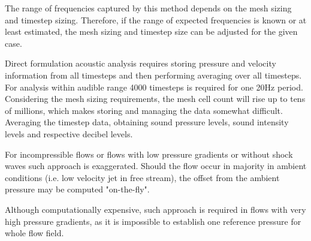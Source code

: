 The range of frequencies captured by this method depends on the mesh sizing and timestep sizing. Therefore, if the range of expected frequencies is known or at least estimated, the mesh sizing and timestep size can be adjusted for the given case.
 
Direct formulation acoustic analysis requires storing pressure and velocity information from all timesteps and then performing averaging over all timesteps. For analysis within audible range 4000 timesteps is required for one 20Hz period. Considering the mesh sizing requirements, the mesh cell count will rise up to tens of millions, which makes storing and managing the data somewhat difficult. Averaging the timestep data, obtaining sound pressure levels, sound intensity levels and respective decibel levels. 

For incompressible flows or flows with low pressure gradients or without shock waves such approach is exaggerated. Should the flow occur in majority in ambient conditions (i.e. low velocity jet in free stream), the offset from the ambient pressure may be computed "on-the-fly".

Although computationally expensive, such approach is required in flows with very high pressure gradients, as it is impossible to establish one reference pressure for whole flow field.





